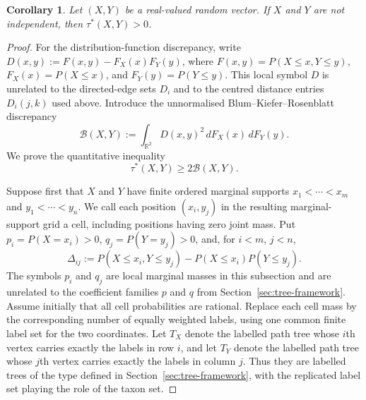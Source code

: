 \documentclass[pdflatex,sn-mathphys-num]{sn-jnl}
\theoremstyle{thmstyleone}
\newtheorem{corollary}{Corollary}
\begin{document}
\begin{corollary}\label{cor:tau-star}
Let $(X,Y)$ be a real-valued random vector.  If $X$ and $Y$ are not
independent, then $\tau^*(X,Y)>0$.
\end{corollary}

\begin{proof}
For the distribution-function discrepancy, write
$D(x,y):=F(x,y)-F_X(x)\allowbreak F_Y(y)$, where
$F(x,y)=P(X\le x,Y\le y)$, $F_X(x)=P(X\le x)$, and
$F_Y(y)=P(Y\le y)$.  This local symbol $D$ is
unrelated to the directed-edge sets $D_i$ and to the centred distance entries
$D_i(j,k)$ used above.  Introduce the unnormalised
Blum--Kiefer--Rosenblatt discrepancy
\begin{equation}\label{eq:BKR-discrepancy}
\mathcal B(X,Y):=\int_{\mathbb R^2}D(x,y)^2\,dF_X(x)\,dF_Y(y).
\end{equation}
We prove the quantitative inequality
\begin{equation}\label{eq:tau-star-BKR-lower-bound}
\tau^*(X,Y)\ge2\mathcal B(X,Y).
\end{equation}

Suppose first that $X$ and $Y$ have finite ordered marginal supports
$x_1<\cdots<x_m$ and $y_1<\cdots<y_n$.
We call each position $(x_i,y_j)$ in the resulting marginal-support grid a cell,
including positions having zero joint mass.
Put $p_i=P(X=x_i)>0$, $q_j=P(Y=y_j)>0$, and, for $i<m$, $j<n$,
\[
\Delta_{ij}:=P(X\le x_i,Y\le y_j)-P(X\le x_i)P(Y\le y_j).
\]
The symbols $p_i$ and $q_j$ are local marginal masses in this subsection and
are unrelated to the coefficient families $p$ and $q$ from
Section~\ref{sec:tree-framework}.
Assume initially that all cell probabilities are rational.  Replace
each cell mass by the corresponding number of equally weighted labels, using
one common finite label set for the two coordinates.  Let $T_X$ denote the
labelled path tree whose $i$th vertex carries exactly the labels in row $i$,
and let $T_Y$ denote the labelled path tree whose $j$th vertex carries exactly
the labels in column $j$.  Thus they are labelled trees of the type defined in
Section~\ref{sec:tree-framework}, with the replicated label set playing the
role of the taxon set.


\end{proof}
\end{document}
